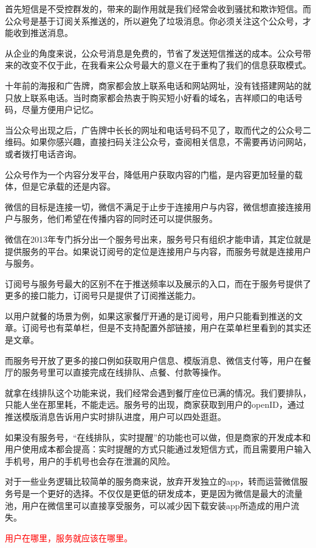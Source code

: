 \documentclass[12pt]{article}
\begin{document}
首先短信是不受控群发的，带来的副作用就是我们经常会收到骚扰和欺诈短信。而公众号是基于订阅关系推送的，所以避免了垃圾消息。你必须关注这个公众号，才能收到推送消息。

从企业的角度来说，公众号消息是免费的，节省了发送短信推送的成本。公众号带来的改变不仅于此，在我看来公众号最大的意义在于重构了我们的信息获取模式。

十年前的海报和广告牌，商家都会放上联系电话和网站网址，没有钱搭建网站的就只放上联系电话。当时商家都会热衷于购买短小好看的域名，吉祥顺口的电话号码，尽量方便用户记忆。

当公众号出现之后，广告牌中长长的网址和电话号码不见了，取而代之的公众号二维码。如果你感兴趣，直接扫码关注公众号，查阅相关信息，不需要再访问网站，或者拨打电话咨询。

公众号作为一个内容分发平台，降低用户获取内容的门槛，是内容更加轻量的载体，但是它承载的还是内容。

微信的目标是连接一切，微信不满足于止步于连接用户与内容，微信想直接连接用户与服务，他们希望在传播内容的同时还可以提供服务。

微信在2013年专门拆分出一个服务号出来，服务号只有组织才能申请，其定位就是提供服务的平台。如果说订阅号的定位是连接用户与内容，而服务号就是连接用户与服务。

订阅号与服务号最大的区别不在于推送频率以及展示的入口，而在于服务号提供了更多的接口能力，订阅号只是提供了订阅推送能力。

以用户就餐的场景为例，如果这家餐厅开通的是订阅号，用户只能看到推送的文章。订阅号也有菜单栏，但是不支持配置外部链接，用户在菜单栏里看到的其实还是文章。

而服务号开放了更多的接口例如获取用户信息、模版消息、微信支付等，用户在餐厅的服务号里可以直接完成在线排队、点餐、付款等操作。

就拿在线排队这个功能来说，我们经常会遇到餐厅座位已满的情况。我们要排队，只能人坐在那里耗，不能走远。服务号的出现，商家获取到用户的openID，通过推送模版消息告诉用户实时排队进度，用户可以四处逛逛。

如果没有服务号，“在线排队，实时提醒”的功能也可以做，但是商家的开发成本和用户使用成本都会提高：实时提醒的方式只能通过发短信方式，而且需要用户输入手机号，用户的手机号也会存在泄漏的风险。

对于一些业务逻辑比较简单的服务商来说，放弃开发独立的app，转而运营微信服务号是一个更好的选择。不仅仅是更低的研发成本，更是因为微信是最大的流量池，用户在微信里可以直接享受服务，可以减少因下载安装app所造成的用户流失。

\textcolor{red}{用户在哪里，服务就应该在哪里。}
\end{document}
